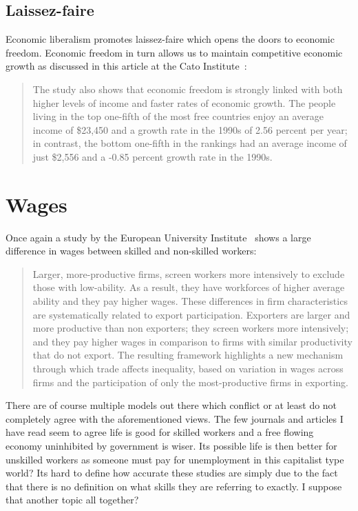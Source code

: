 \documentclass[pdftex,12pt,a4paper]{report}
\begin{document}
\subsection{Laissez-faire}
\begin{doublespace}
Economic liberalism promotes laissez-faire which opens the doors to economic freedom. Economic freedom in turn allows us to maintain competitive economic growth as discussed in this article at the Cato Institute~\citep*{lawson2011economic}:
\end{doublespace}
\begin{quotation}
The study also shows that economic freedom is strongly linked with both higher levels of income and faster rates of economic growth. The people living in the top one-fifth of the most free countries enjoy an average income of \$23,450 and a growth rate in the 1990s of 2.56 percent per year; in contrast, the bottom one-fifth in the rankings had an average income of just \$2,556 and a -0.85 percent growth rate in the 1990s.
\end{quotation}
\section{Wages}
\begin{doublespace}
Once again a study by the European University Institute~\citep*{helpman2011trade} shows a large difference in wages between skilled and non-skilled workers:
\end{doublespace}
\begin{quote}
Larger, more-productive firms, screen workers more intensively to exclude those with low-ability. As a result, they have workforces of higher average ability and they pay higher wages. These differences in firm characteristics are systematically related to export participation. Exporters are larger and more productive than non exporters; they screen workers more intensively; and they pay higher wages in comparison to firms with similar productivity that do not export. The resulting framework highlights a new mechanism through which trade affects inequality, based on variation in wages across firms and the participation of only the most-productive firms in exporting.
\end{quote}
\begin{doublespace}
There are of course multiple models out there which conflict or at least do not completely agree with the aforementioned views. The few journals and articles I have read seem to agree life is good for skilled workers and a free flowing economy uninhibited by government is wiser. Its possible life is then better for unskilled workers as someone must pay for unemployment in this capitalist type world? Its hard to define how accurate these studies are simply due to the fact that there is no definition on what skills they are referring to exactly. I suppose that another topic all together?
\end{doublespace}
\clearpage
    \nocite{*}
    
    
\end{document}
